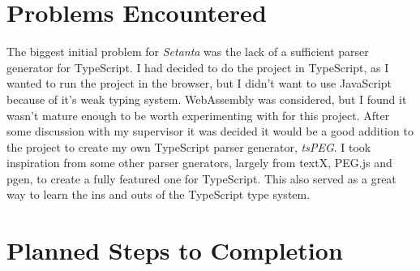 \documentclass[11pt]{extarticle}
\newcommand{\Setanta}{\emph{Setanta}}
\newcommand{\tsPEG}{\emph{tsPEG}}
\begin{document}
    \section*{Problems Encountered}

    The biggest initial problem for \Setanta{} was the lack of a sufficient parser generator for TypeScript. I had decided to do the project in TypeScript, as I wanted to run the project in the browser, but I didn't want to use JavaScript because of it's weak typing system. WebAssembly was considered, but I found it wasn't mature enough to be worth experimenting with for this project.
    After some discussion with my supervisor it was decided it would be a good addition to the project to create my own TypeScript parser generator, \tsPEG{}. I took inspiration from some other parser gnerators, largely from textX, PEG.js and pgen, to create a fully featured one for TypeScript. This also served as a great way to learn the ins and outs of the TypeScript type system.
    \section*{Planned Steps to Completion}
\end{document}
